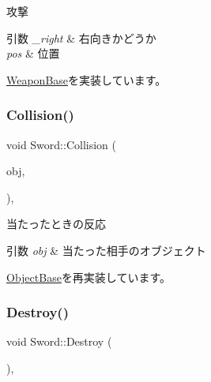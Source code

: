 攻撃 


\begin{DoxyParams}{引数}
{\em \+\_\+right} & 右向きかどうか \\
\hline
{\em pos} & 位置 \\
\hline
\end{DoxyParams}


\mbox{\hyperlink{class_weapon_base_a1bab9c7fb9524db754bebbbcbf6c2fd9}{Weapon\+Base}}を実装しています。

\mbox{\label{class_sword_a1dcab625754ca097ad814ee544c6a872}} 
\subsubsection{\texorpdfstring{Collision()}{Collision()}}
{\footnotesize\ttfamily void Sword\+::\+Collision (\begin{DoxyParamCaption}\item[{\mbox{\hyperlink{class_object_base}{Object\+Base}} $\ast$}]{obj,  }\item[{\mbox{\hyperlink{common_8h_ae148fff5818e9444b4ab2288829559bf}{Vec2}}}]{ }\end{DoxyParamCaption})\hspace{0.3cm}{\ttfamily [final]}, {\ttfamily [virtual]}}



当たったときの反応 


\begin{DoxyParams}{引数}
{\em obj} & 当たった相手のオブジェクト \\
\hline
\end{DoxyParams}


\mbox{\hyperlink{class_object_base_a3e1db79dfa119be067d816c22d09839d}{Object\+Base}}を再実装しています。

\mbox{\label{class_sword_a8473b694775374df4d9b6305cfa82293}} 
\subsubsection{\texorpdfstring{Destroy()}{Destroy()}}
{\footnotesize\ttfamily void Sword\+::\+Destroy (\begin{DoxyParamCaption}{ }\end{DoxyParamCaption})\hspace{0.3cm}{\ttfamily [inline]}, {\ttfamily [virtual]}}



